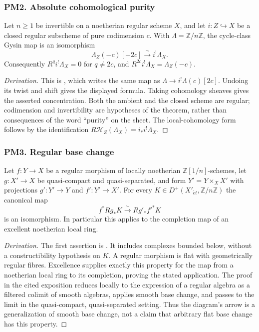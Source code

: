 \subsubsection{PM2. Absolute cohomological purity}
\begin{theorem}\label{B:PM2}
Let $n\geq1$ be invertible on a noetherian regular scheme $X$, and let $i:Z\hookrightarrow X$ be a closed regular subscheme of pure codimension $c$. With $\Lambda=\mathbb Z/n\mathbb Z$, the cycle-class Gysin map is an isomorphism
\[
 \Lambda_Z(-c)[-2c]\xrightarrow{\sim}i^!\Lambda_X.
\]
Consequently $R^qi^!\Lambda_X=0$ for $q\ne2c$, and $R^{2c}i^!\Lambda_X=\Lambda_Z(-c)$.
\end{theorem}
\begin{proof}[Derivation]
This is \cite[Expos\'e XVI, Theorem 3.1.1, p.~222]{BILO2014}, which writes the same map as $\Lambda\to i^!\Lambda(c)[2c]$. Undoing its twist and shift gives the displayed formula. Taking cohomology sheaves gives the asserted concentration. Both the ambient and the closed scheme are regular; codimension and invertibility are hypotheses of the theorem, rather than consequences of the word ``purity'' on the sheet. The local-cohomology form follows by the identification $R\mathcal H_Z(\Lambda_X)=i_*i^!\Lambda_X$.
\end{proof}

\subsubsection{PM3. Regular base change}
\begin{theorem}\label{B:PM3}
Let $f:Y\to X$ be a regular morphism of locally noetherian $\mathbb Z[1/n]$-schemes, let $g:X'\to X$ be quasi-compact and quasi-separated, and form $Y'=Y\times_XX'$ with projections $g':Y'\to Y$ and $f':Y'\to X'$. For every $K\in D^+(X'_{\acute et},\mathbb Z/n\mathbb Z)$ the canonical map
\[
 f^*Rg_*K\xrightarrow{\sim}Rg'_*f'^*K
\]
is an isomorphism. In particular this applies to the completion map of an excellent noetherian local ring.
\end{theorem}
\begin{proof}[Derivation]
The first assertion is \cite[Expos\'e XIV, Theorem 2.5.3; Expos\'e XVII, Proposition 4.2.1, p.~264]{BILO2014}. It includes complexes bounded below, without a constructibility hypothesis on $K$. A regular morphism is flat with geometrically regular fibres. Excellence supplies exactly this property for the map from a noetherian local ring to its completion, proving the stated application. The proof in the cited exposition reduces locally to the expression of a regular algebra as a filtered colimit of smooth algebras, applies smooth base change, and passes to the limit in the quasi-compact, quasi-separated setting. Thus the diagram's arrow is a generalization of smooth base change, not a claim that arbitrary flat base change has this property.
\end{proof}

